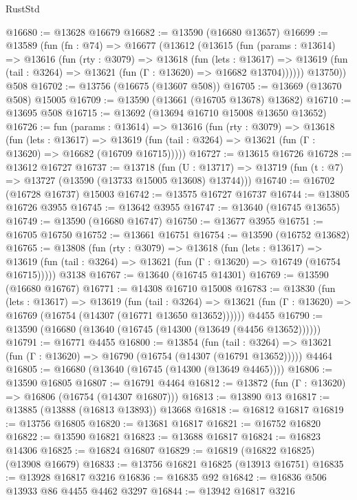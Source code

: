 \begin{lexlean}{RustStd}
\begin{coremodule}
@16680 := @13628 @16679
@16682 := @13590 (@16680 @13657)
@16699 := @13589
    (fun (fn : @74) =>
    @16677
      (@13612
        (@13615
          (fun (params : @13614) =>
          @13616
            (fun (rty : @3079) =>
            @13618
              (fun (lets : @13617) =>
              @13619 (fun (tail : @3264) => @13621 (fun (Γ : @13620) => @16682 @13704))))))
        @13750))
    @508
@16702 := @13756 (@16675 (@13607 @508))
@16705 := @13669 (@13670 @508) @15005
@16709 := @13590 (@13661 (@16705 @13678) @13682)
@16710 := @13695 @508
@16715 := @13692 (@13694 @16710 @15008 @13650 @13652)
@16726 := fun (params : @13614) =>
  @13616
    (fun (rty : @3079) =>
    @13618
      (fun (lets : @13617) =>
      @13619 (fun (tail : @3264) => @13621 (fun (Γ : @13620) => @16682 (@16709 @16715)))))
@16727 := @13615 @16726
@16728 := @13612 @16727
@16737 := @13718
    (fun (U : @13717) => @13719 (fun (t : @7) => @13727 (@13590 (@13733 @15005 @13608) @13744)))
@16740 := @16702 (@16728 @16737) @15003
@16742 := @13575 @16727 @16737
@16744 := @13805 @16726 @3955
@16745 := @13642 @3955
@16747 := @13640 (@16745 @13655)
@16749 := @13590 (@16680 @16747)
@16750 := @13677 @3955
@16751 := @16705 @16750
@16752 := @13661 @16751
@16754 := @13590 (@16752 @13682)
@16765 := @13808
    (fun (rty : @3079) =>
    @13618
      (fun (lets : @13617) =>
      @13619 (fun (tail : @3264) => @13621 (fun (Γ : @13620) => @16749 (@16754 @16715)))))
    @3138
@16767 := @13640 (@16745 @14301)
@16769 := @13590 (@16680 @16767)
@16771 := @14308 @16710 @15008
@16783 := @13830
    (fun (lets : @13617) =>
    @13619
      (fun (tail : @3264) =>
      @13621 (fun (Γ : @13620) => @16769 (@16754 (@14307 (@16771 @13650 @13652))))))
    @4455
@16790 := @13590 (@16680 (@13640 (@16745 (@14300 (@13649 (@4456 @13652))))))
@16791 := @16771 @4455
@16800 := @13854
    (fun (tail : @3264) => @13621 (fun (Γ : @13620) => @16790 (@16754 (@14307 (@16791 @13652)))))
    @4464
@16805 := @16680 (@13640 (@16745 (@14300 (@13649 @4465))))
@16806 := @13590 @16805
@16807 := @16791 @4464
@16812 := @13872 (fun (Γ : @13620) => @16806 (@16754 (@14307 @16807)))
@16813 := @13890 @13
@16817 := @13885 (@13888 (@16813 @13893)) @13668
@16818 := @16812 @16817
@16819 := @13756 @16805
@16820 := @13681 @16817
@16821 := @16752 @16820
@16822 := @13590 @16821
@16823 := @13688 @16817
@16824 := @16823 @14306
@16825 := @16824 @16807
@16829 := @16819 (@16822 @16825) (@13908 @16679)
@16833 := @13756 @16821 @16825 (@13913 @16751)
@16835 := @13928 @16817 @3216
@16836 := @16835 @92
@16842 := @16836 @506 @13933 @86 @4455 @4462 @3297
@16844 := @13942 @16817 @3216

\end{coremodule}
\end{lexlean}
